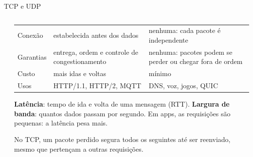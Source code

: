 \begin{frame}{TCP e UDP}
  \begin{columns}[c]
    \begin{column}{0.4\textwidth}
      \centering
    \end{column}
    \begin{column}{0.58\textwidth}
      \scriptsize
      \begin{tabularx}{\linewidth}{@{}l L L@{}}
        \toprule
         &  &  \\
        \midrule
        Conexão & estabelecida antes dos dados & nenhuma: cada pacote é independente \\
        Garantias & entrega, ordem e controle de congestionamento & nenhuma: pacotes podem se perder ou chegar fora de ordem \\
        Custo & mais idas e voltas & mínimo \\
        Usos & HTTP/1.1, HTTP/2, MQTT & DNS, voz, jogos, QUIC \\
        \bottomrule
      \end{tabularx}
      \normalsize
      \begin{definicao}
        \textbf{Latência}: tempo de ida e volta de uma mensagem (RTT). \textbf{Largura de banda}: quantos dados passam por segundo. Em apps, as requisições são pequenas: a latência pesa mais.
      \end{definicao}
      \begin{pordentro}
        No TCP, um pacote perdido segura todos os seguintes até ser reenviado, mesmo que pertençam a outras requisições.
      \end{pordentro}
    \end{column}
  \end{columns}
\end{frame}


